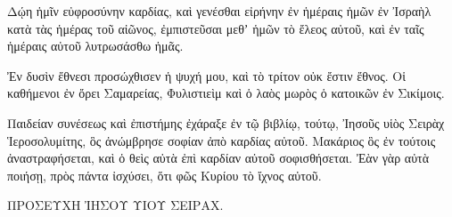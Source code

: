 {Δῴη ἡμῖν εὐφροσύνην καρδίας, καὶ γενέσθαι εἰρήνην ἐν ἡμέραις ἡμῶν ἐν Ἰσραὴλ κατὰ τὰς ἡμέρας τοῦ αἰῶνος,
ἐμπιστεῦσαι μεθʼ ἡμῶν τὸ ἔλεος αὐτοῦ, καὶ ἐν ταῖς ἡμέραις αὐτοῦ λυτρωσάσθω ἡμᾶς.
\par }{\PP {}Ἐν δυσὶν ἔθνεσι προσώχθισεν ἡ ψυχή μου, καὶ τὸ τρίτον οὐκ ἔστιν ἔθνος.
Οἱ καθήμενοι ἐν ὄρει Σαμαρείας, Φυλιστιεὶμ καὶ ὁ λαὸς μωρὸς ὁ κατοικῶν ἐν Σικίμοις.
\par }{\PP {}Παιδείαν συνέσεως καὶ ἐπιστήμης ἐχάραξε ἐν τῷ βιβλίῳ, τούτῳ, Ἰησοῦς υἱὸς Σειρὰχ Ἱεροσολυμίτης, ὃς ἀνώμβρησε σοφίαν ἀπὸ καρδίας αὐτοῦ.
Μακάριος ὃς ἐν τούτοις ἀναστραφήσεται, καὶ ὁ θεὶς αὐτὰ ἐπὶ καρδίαν αὐτοῦ σοφισθήσεται.
Ἐὰν γὰρ αὐτὰ ποιήσῃ, πρὸς πάντα ἰσχύσει, ὅτι φῶς Κυρίου τὸ ἴχνος αὐτοῦ.
\par }{\PP ΠΡΟΣΕΥΧΗ ἸΗΣΟΥ ΥΙΟΥ ΣΕΙΡΑΧ.

}

